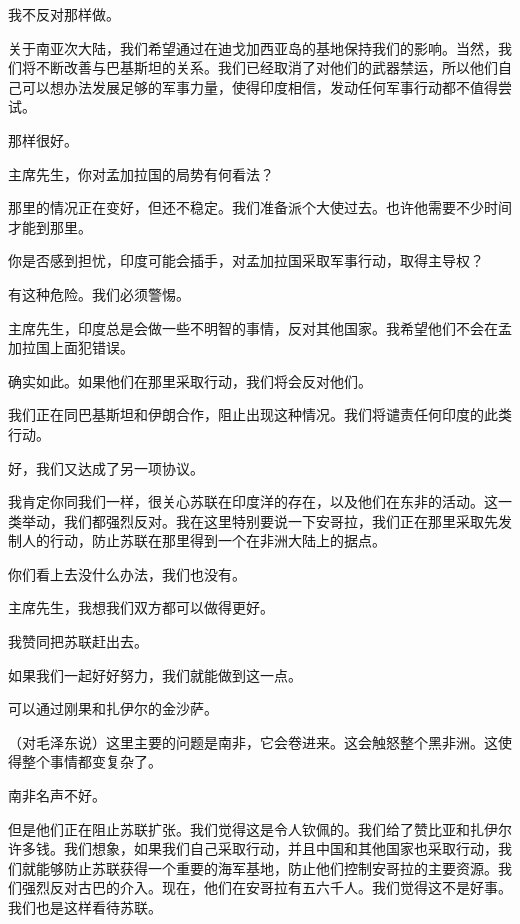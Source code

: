 我不反对那样做。

关于南亚次大陆，我们希望通过在迪戈加西亚岛的基地保持我们的影响。当然，我们将不断改善与巴基斯坦的关系。我们已经取消了对他们的武器禁运，所以他们自己可以想办法发展足够的军事力量，使得印度相信，发动任何军事行动都不值得尝试。

那样很好。

主席先生，你对孟加拉国的局势有何看法？

那里的情况正在变好，但还不稳定。我们准备派个大使过去。也许他需要不少时间才能到那里。

你是否感到担忧，印度可能会插手，对孟加拉国采取军事行动，取得主导权？

有这种危险。我们必须警惕。

主席先生，印度总是会做一些不明智的事情，反对其他国家。我希望他们不会在孟加拉国上面犯错误。

确实如此。如果他们在那里采取行动，我们将会反对他们。

我们正在同巴基斯坦和伊朗合作，阻止出现这种情况。我们将谴责任何印度的此类行动。

好，我们又达成了另一项协议。

我肯定你同我们一样，很关心苏联在印度洋的存在，以及他们在东非的活动。这一类举动，我们都强烈反对。我在这里特别要说一下安哥拉，我们正在那里采取先发制人的行动，防止苏联在那里得到一个在非洲大陆上的据点。

你们看上去没什么办法，我们也没有。

主席先生，我想我们双方都可以做得更好。

我赞同把苏联赶出去。

如果我们一起好好努力，我们就能做到这一点。

可以通过刚果和扎伊尔的金沙萨。

（对毛泽东说）这里主要的问题是南非，它会卷进来。这会触怒整个黑非洲。这使得整个事情都变复杂了。

南非名声不好。

但是他们正在阻止苏联扩张。我们觉得这是令人钦佩的。我们给了赞比亚和扎伊尔许多钱。我们想象，如果我们自己采取行动，并且中国和其他国家也采取行动，我们就能够防止苏联获得一个重要的海军基地，防止他们控制安哥拉的主要资源。我们强烈反对古巴的介入。现在，他们在安哥拉有五六千人。我们觉得这不是好事。我们也是这样看待苏联。

